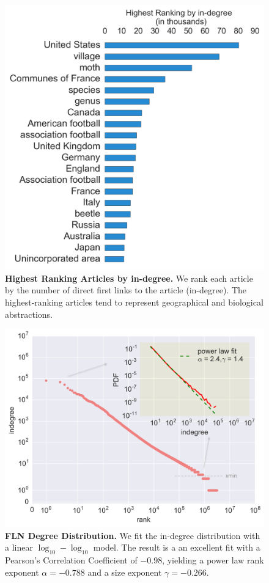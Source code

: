 \documentclass[pre,twocolumn,twoside,byrevtex,superscriptaddress,floatfix]{revtex4-1}
\begin{document}
\begin{figure}[tp!]
  \includegraphics[width=\columnwidth]{../graphics/articles_ndegree.png}
  \caption{
    \textbf{Highest Ranking Articles by in-degree.}
    We rank each article by the number of direct first links to the article (in-degree). The highest-ranking articles tend to represent geographical and biological abstractions. 
}
  \label{fig:indegree list}
\end{figure}
\begin{figure}[tp!]
  \includegraphics[width=\columnwidth]{../graphics/ndegree_loglog.png}
  \caption{
    \textbf{FLN Degree Distribution.}
We fit the in-degree distribution with a linear $\log_{10}-\log_{10}$ model. 
The result is a 
an excellent fit with a Pearson's Correlation Coefficient of $-0.98$, yielding a 
power law rank exponent $\alpha = -0.788$ and a size exponent $\gamma = -0.266$. 
}
  \label{fig:degree distribution}
\end{figure}
\end{document}
